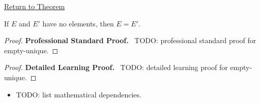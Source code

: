 \newpage
{}
\label{prf:empty-unique}

\begin{remark*}[Return]
\hyperref[prop:empty-unique]{Return to Theorem}
\end{remark*}

\begin{theorem*}
If $E$ and $E'$ have no elements, then $E=E'$.
\end{theorem*}

\begin{proof}
\textbf{Professional Standard Proof.}~
TODO: professional standard proof for empty-unique.
\end{proof}

\begin{proof}
\textbf{Detailed Learning Proof.}~
TODO: detailed learning proof for empty-unique.
\end{proof}

\begin{remark*}
\end{remark*}

\begin{dependencies}
\begin{itemize}
  \item TODO: list mathematical dependencies.
\end{itemize}
\end{dependencies}

\clearpage
